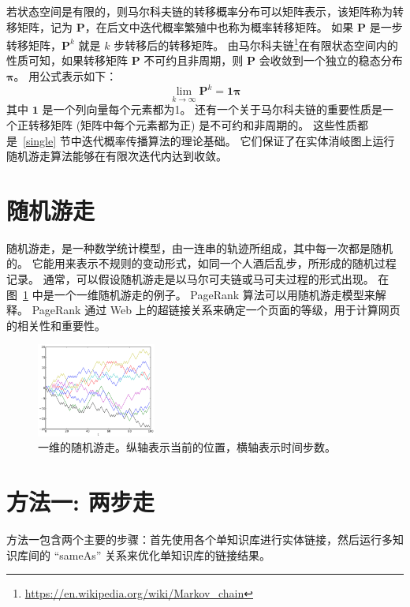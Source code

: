 若状态空间是有限的，则马尔科夫链的转移概率分布可以矩阵表示，该矩阵称为转移矩阵，记为 $\bm{P}$，在后文中迭代概率繁殖中也称为概率转移矩阵。
如果 $\bm{P}$ 是一步转移矩阵，$\bm{P}^k$ 就是 $k$ 步转移后的转移矩阵。
由马尔科夫链\footnote{\url{https://en.wikipedia.org/wiki/Markov_chain}}在有限状态空间内的性质\cite{tauchen1986finite}可知，如果转移矩阵 $\bm{P}$ 不可约且非周期，则 $\bm{P}$ 会收敛到一个独立的稳态分布 $\bm{\pi}$。
用公式表示如下：
\begin{equation}
	\lim_{k \rightarrow \infty} \bm{P}^k = \bm{1} \bm{\pi}
\label{pk}
\end{equation}
其中 $\bm{1}$ 是一个列向量每个元素都为1。
还有一个关于马尔科夫链的重要性质是一个正转移矩阵 (矩阵中每个元素都为正) 是不可约和非周期的。
这些性质都是~\ref{single} 节中迭代概率传播算法的理论基础。
它们保证了在实体消岐图上运行随机游走算法能够在有限次迭代内达到收敛。


\section{随机游走}
随机游走，是一种数学统计模型，由一连串的轨迹所组成，其中每一次都是随机的。
它能用来表示不规则的变动形式，如同一个人酒后乱步，所形成的随机过程记录。
通常，可以假设随机游走是以马尔可夫链或马可夫过程的形式出现。
在图~\ref{random_walk} 中是一个一维随机游走的例子。
PageRank\cite{page1999pagerank} 算法可以用随机游走模型来解释\cite{haveliwala2003topic}。
PageRank 通过 Web 上的超链接关系来确定一个页面的等级，用于计算网页的相关性和重要性。

\begin{figure}[htbp]
\centering
\includegraphics[width=0.35\textwidth]{img/random_walk}
\caption{一维的随机游走。纵轴表示当前的位置，横轴表示时间步数。}
\label{random_walk}
\end{figure}


\section{方法一: 两步走}\label{approach1}

方法一包含两个主要的步骤：首先使用各个单知识库进行实体链接，然后运行多知识库间的 ``sameAs'' 关系来优化单知识库的链接结果。


